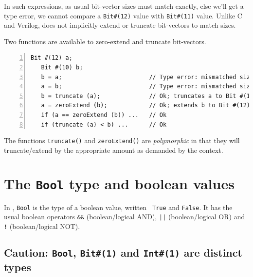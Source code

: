 In such expressions, as usual bit-vector sizes must match exactly,
else we'll get a type error, {\eg} we cannot compare a
\verb|Bit#(12)| value with \verb|Bit#(11)| value.  Unlike C and
Verilog, {\BSV} does not implicitly extend or truncate bit-vectors to
match sizes.


Two functions are available to zero-extend and truncate bit-vectors.

{\footnotesize
\begin{Verbatim}[frame=single, numbers=left]
   Bit #(12) a;
   Bit #(10) b;
   b = a;                         // Type error: mismatched sizes
   a = b;                         // Type error: mismatched sizes
   b = truncate (a);              // Ok; truncates a to Bit #(10), then assigns
   a = zeroExtend (b);            // Ok; extends b to Bit #(12), then assigns
   if (a == zeroExtend (b)) ...   // Ok
   if (truncate (a) < b) ...      // Ok
\end{Verbatim}
}

The functions \verb|truncate()| and \verb|zeroExtend()| are
\emph{polymorphic} in that they will truncate/extend by the
appropriate amount as demanded by the context.


\section{The {\tt Bool} type and boolean values}

\label{Sec_BSV_Boolean_values}


In {\BSV}, \verb|Bool| is the type of a boolean value, written {\tt
True} and {\tt False}. It has the usual boolean operators \verb|&&|
(boolean/logical AND), \verb'||' (boolean/logical OR) and \verb|!|
(boolean/logical NOT).


\subsection{Caution: {\tt Bool}, {\tt Bit\#(1)} and {\tt Int\#(1)} are distinct types}

